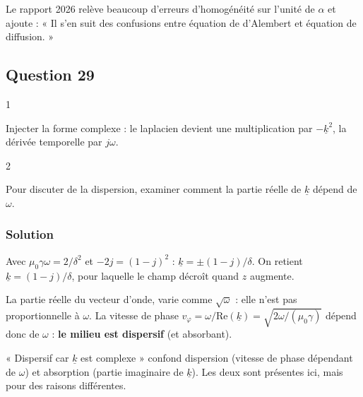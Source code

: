 \documentclass[11pt,a4paper]{article}
\newcommand{\equationajustee}[1]{%
  \sbox{\boiteequation}{$\displaystyle #1$}%
  \ifdim\wd\boiteequation>\linewidth
    \[\resizebox{\linewidth}{!}{\usebox{\boiteequation}}\]%
  \else
    \[#1\]%
  \fi}
\begin{document}
\begin{jury}

Le rapport 2026 relève beaucoup d'erreurs d'homogénéité sur l'unité de \(\alpha\) et ajoute : « Il s'en suit des confusions entre équation de d'Alembert et équation de diffusion. »

\end{jury}

\hypertarget{question-29}{%
\subsection{Question 29}\label{question-29}}

\begin{indication}{1}

Injecter la forme complexe : le laplacien devient une multiplication par \(-\underline k^2\), la dérivée temporelle par \(j\omega\).

\end{indication}

\begin{indication}{2}

Pour discuter de la dispersion, examiner comment la partie réelle de \(\underline k\) dépend de \(\omega\).

\end{indication}

\hypertarget{solution-28}{%
\subsubsection{Solution}\label{solution-28}}

\equationajustee{\boxed{\underline k^2=-j\mu_0\gamma\omega}}
Avec \(\mu_0\gamma\omega=2/\delta^2\) et \(-2j=(1-j)^2\) : \(\underline k=\pm(1-j)/\delta\). On retient \(\underline k=(1-j)/\delta\), pour laquelle le champ décroît quand \(z\) augmente.

La partie réelle du vecteur d'onde,
\equationajustee{\mathrm{Re}(\underline k)=\frac1\delta=\sqrt{\frac{\mu_0\gamma\omega}{2}},}
varie comme \(\sqrt\omega\) : elle n'est pas proportionnelle à \(\omega\). La vitesse de phase \(v_\varphi=\omega/\mathrm{Re}(\underline k)=\sqrt{2\omega/(\mu_0\gamma)}\) dépend donc de \(\omega\) : \textbf{le milieu est dispersif} (et absorbant).

\begin{piege}

« Dispersif car \(\underline k\) est complexe » confond dispersion (vitesse de phase dépendant de \(\omega\)) et absorption (partie imaginaire de \(\underline k\)). Les deux sont présentes ici, mais pour des raisons différentes.

\end{piege}
\end{document}
